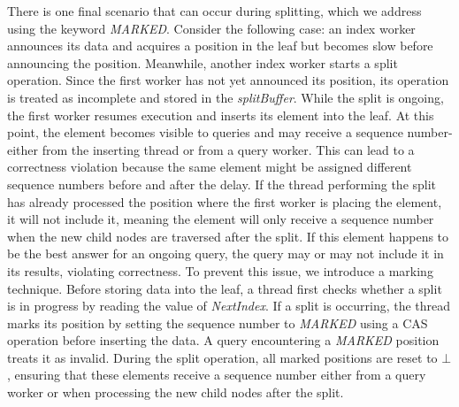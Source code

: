 \documentclass[a4paper,11pt,twoside,openany]{book}
\begin{document}
There is one final scenario that can occur during splitting, which we address
using the keyword \textit{MARKED}. Consider the following case: an index worker
announces its data and acquires a position in the leaf but becomes slow before
announcing the position. Meanwhile, another index worker starts a split operation.
Since the first worker has not yet announced its position, its operation is treated
as incomplete and stored in the \textit{splitBuffer}.  
%
While the split is ongoing, the first worker resumes execution and inserts its element
into the leaf. At this point, the element becomes visible to queries and may receive
a sequence number-either from the inserting thread or from a query worker. This can
lead to a correctness violation because the same element might be assigned different
sequence numbers before and after the delay. If the thread performing the split has
already processed the position where the first worker is placing the element,
it will not include it, meaning the element will only receive a sequence number
when the new child nodes are traversed after the split. If this element happens
to be the best answer for an ongoing query, the query may or may not include it in
its results, violating correctness.  
%
To prevent this issue, we introduce a marking technique. Before storing data into 
the leaf, a thread first checks whether a split is in progress by reading the value
of \textit{NextIndex}. If a split is occurring, the thread marks its position
by setting the sequence number to \textit{MARKED} using a CAS operation before
inserting the data. A query encountering a \textit{MARKED} position treats it as 
invalid. During the split operation, all marked positions are reset to \( \bot \), 
ensuring that these elements receive a sequence number either from a query worker
or when processing the new child nodes after the split.








\cleardoublepage
{}

\end{document}
